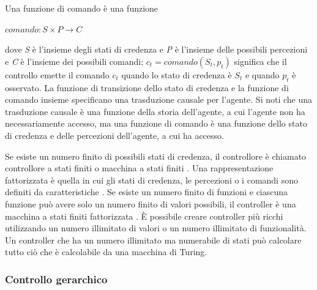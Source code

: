 \documentclass[a4paper]{extarticle}
\begin{document}
Una funzione di comando è una funzione
\begin{center}
$comando: S \times P \rightarrow C$
\end{center}
dove \textit{S} è l'insieme degli stati di credenza e \textit{P} è l'insieme delle possibili percezioni e \textit{C} è l'insieme dei possibili comandi; $c_t = comando(S_t,p_t)$ significa che il controllo emette il comando $c_t$ quando lo stato di credenza è $S_t$ e quando $p_t$ è osservato. La funzione di transizione dello stato di credenza e la funzione di comando insieme specificano una trasduzione causale per l'agente. Si noti che una trasduzione causale è una funzione della storia dell'agente, a cui l'agente non ha necessariamente accesso, ma una funzione di comando è una funzione dello stato di credenza e delle percezioni dell'agente, a cui ha accesso.

Se esiste un numero finito di possibili stati di credenza, il controllore è chiamato controllore a stati finiti o macchina a stati finiti . Una rappresentazione fattorizzata è quella in cui gli stati di credenza, le percezioni o i comandi sono definiti da caratteristiche . Se esiste un numero finito di funzioni e ciascuna funzione può avere solo un numero finito di valori possibili, il controller è una macchina a stati finiti fattorizzata . È possibile creare controller più ricchi utilizzando un numero illimitato di valori o un numero illimitato di funzionalità. Un controller che ha un numero illimitato ma numerabile di stati può calcolare tutto ciò che è calcolabile da una macchina di Turing.

\subsubsection{Controllo gerarchico}
\end{document}
